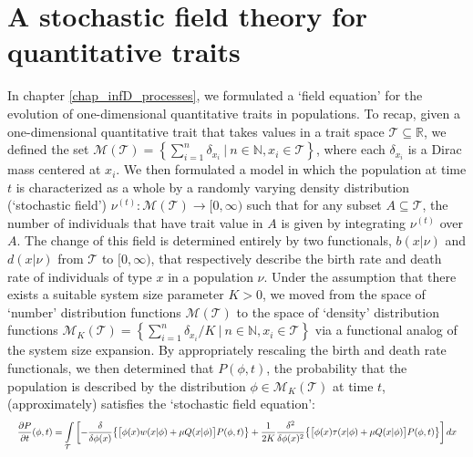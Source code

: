 \section{A stochastic field theory for quantitative traits}\label{sec_disc_field_eqns}

In chapter \ref{chap_infD_processes}, we formulated a `field equation' for the evolution of one-dimensional quantitative traits in populations. To recap, given a one-dimensional quantitative trait that takes values in a trait space $\mathcal{T} \subseteq \mathbb{R}$, we defined the set $\mathcal{M}(\mathcal{T}) =  \left\{\sum_{i=1}^{n}\delta_{x_i} \ | \ n \in \mathbb{N}, x_i \in \mathcal{T}\right\}$, where each $\delta_{x_i}$ is a Dirac mass centered at $x_i$. We then formulated a model in which the population at time $t$ is characterized as a whole by a randomly varying density distribution (`stochastic field') $\nu^{(t)}: \mathcal{M}(\mathcal{T}) \to [0,\infty)$ such that for any subset $A \subseteq \mathcal{T}$, the number of individuals that have trait value in $A$ is given by integrating $\nu^{(t)}$ over $A$. The change of this field is determined entirely by two functionals, $b(x|\nu)$ and $d(x|\nu)$ from $\mathcal{T}$ to $[0,\infty)$, that respectively describe the birth rate and death rate of individuals of type $x$ in a population $\nu$. Under the assumption that there exists a suitable system size parameter $K > 0$, we moved from the space of `number' distribution functions $\mathcal{M}(
\mathcal{T})$ to the space of `density' distribution functions $\mathcal{M}_{K}(\mathcal{T}) =  \left\{\sum_{i=1}^{n}\delta_{x_i}/K \ | \ n \in \mathbb{N}, x_i \in \mathcal{T}\right\}$ via a functional analog of the system size expansion. By appropriately rescaling the birth and death rate functionals, we then determined that $P(\phi,t)$, the probability that the population is described by the distribution $\phi \in \mathcal{M}_{K}(\mathcal{T})$ at time $t$, (approximately) satisfies the `stochastic field equation':
\begin{equation}
\label{disc_functional_field_eqns}
\resizebox{\textwidth}{!}{$\displaystyle
\frac{\partial P}{\partial t}(\phi,t) = \int\limits_{\mathcal{T}}\left[-
\frac{\delta}{\delta\phi(x)} \big{\{} \big{[}\phi(x) w(x|\phi) + \mu Q(x|\phi)\big{]} P(\phi,t) \big{\}} + \frac{1}{2K}\frac{\delta^2}{\delta\phi(x)^2}\big{\{}\big{[}\phi(x) \tau(x|\phi) + \mu Q(x|\phi)\big{]}P(\phi,t)\big{\}}\right]dx$}
\end{equation}

